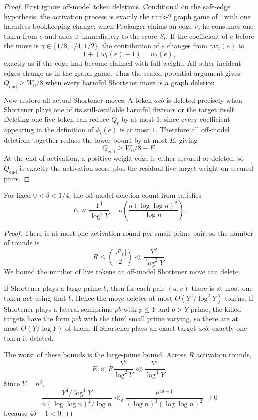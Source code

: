 \begin{proof}
First ignore off-model token deletions.  Conditional on the safe-edge
hypothesis, the activation process is exactly the rank-$2$ graph game of
, with one harmless
bookkeeping change: when Prolonger claims an edge $e$, he consumes one token
from $e$ and adds it immediately to the score $S_t$.  If the coefficient of
$e$ before the move is $\gamma\in\{1/8,1/4,1/2\}$, the contribution of $e$
changes from $\gamma w_t(e)$ to
\[
  1+(w_t(e)-1)=w_t(e),
\]
exactly as if the edge had become claimed with full weight.  All other
incident edges change as in the graph game.  Thus the scaled potential
argument gives $Q_{\mathrm{end}}\ge W_0/8$ when every harmful Shortener move is
a graph deletion.

Now restore all actual Shortener moves.  A token $acb$ is deleted precisely
when Shortener plays one of its still-available harmful divisors or the target
itself.  Deleting one live token can reduce $Q_t$ by at most $1$, since every
coefficient appearing in the definition of $\phi_t(e)$ is at most $1$.
Therefore all off-model deletions together reduce the lower bound by at most
$E$, giving
\[
  Q_{\mathrm{end}}\ge W_0/8-E.
\]
At the end of activation, a positive-weight edge is either secured or deleted,
so $Q_{\mathrm{end}}$ is exactly the activation score plus the residual live
target weight on secured pairs.
\end{proof}

\begin{proposition}\label{prop:t2-deletion-budget}
For fixed $0<\delta<1/4$, the off-model deletion count from
 satisfies
\[
  E\ll \frac{Y^4}{\log^4 Y}
  =
  o\!\left(\frac{n(\log\log n)^2}{\log n}\right).
\]
\end{proposition}

\begin{proof}
There is at most one activation round per small-prime pair, so the number of
rounds is
\[
  R\le \binom{|\mathcal P_Y|}{2}
  \ll \frac{Y^2}{\log^2Y}.
\]
We bound the number of live tokens an off-model Shortener move can delete.

If Shortener plays a large prime $b$, then for each pair $(a,c)$ there is at
most one token $acb$ using that $b$.  Hence the move deletes at most
$O(Y^2/\log^2Y)$ tokens.  If Shortener plays a lateral semiprime $pb$ with
$p\le Y$ and $b>Y$ prime, the killed targets have the form $pcb$ with the
third small prime varying, so there are at most $O(Y/\log Y)$ of them.  If
Shortener plays an exact target $acb$, exactly one token is deleted.

The worst of these bounds is the large-prime bound.  Across $R$ activation
rounds,
\[
  E\ll R\frac{Y^2}{\log^2Y}
  \ll \frac{Y^4}{\log^4Y}.
\]
Since $Y=n^\delta$,
\[
  \frac{Y^4/\log^4Y}{n(\log\log n)^2/\log n}
  \ll_\delta
  \frac{n^{4\delta-1}}{(\log n)^3(\log\log n)^2}
  \to 0
\]
because $4\delta-1<0$.
\end{proof}


